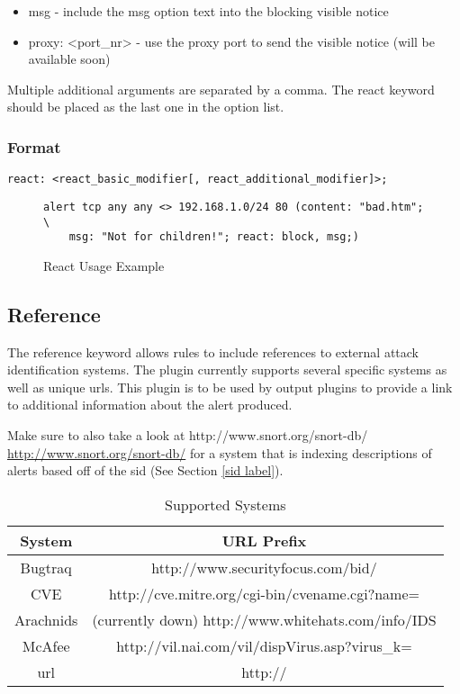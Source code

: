 \documentclass[english]{report}
\begin{document}
\begin{itemize}
\item msg - include the msg option text into the blocking visible notice 
\item proxy: <port\_nr> - use the proxy port to send the visible notice
(will be available soon)
\end{itemize}
Multiple additional arguments are separated by a comma. The react
keyword should be placed as the last one in the option list.


\subsubsection{Format}

\begin{verbatim}
react: <react_basic_modifier[, react_additional_modifier]>;
\end{verbatim}
%
\begin{figure}[!hbpt]
\begin{verbatim}
alert tcp any any <> 192.168.1.0/24 80 (content: "bad.htm"; \
    msg: "Not for children!"; react: block, msg;) 
\end{verbatim}
\caption{\label{react examples}React Usage Example}
\end{figure}



\subsection{Reference }

The reference keyword allows rules to include references to external
attack identification systems. The plugin currently supports several
specific systems as well as unique urls. This plugin is to be used
by output plugins to provide a link to additional information about
the alert produced.

Make sure to also take a look at http://www.snort.org/snort-db/ \url{http://www.snort.org/snort-db/}
for a system that is indexing descriptions of alerts based off of
the sid (See Section \ref{sid label}).%
\begin{table}[!hbpt]

\caption{Supported Systems \label{references systems}}

\begin{center}\begin{tabular}{|c|c|}
\hline 
System&
URL Prefix\\
\hline
\hline 
Bugtraq&
http://www.securityfocus.com/bid/\\
\hline 
CVE&
http://cve.mitre.org/cgi-bin/cvename.cgi?name=\\
\hline 
Arachnids&
(currently down) http://www.whitehats.com/info/IDS\\
\hline 
McAfee&
http://vil.nai.com/vil/dispVirus.asp?virus\_k=\\
\hline 
url&
http://\\
\hline
\end{tabular}\end{center}
\end{table}
\end{document}
